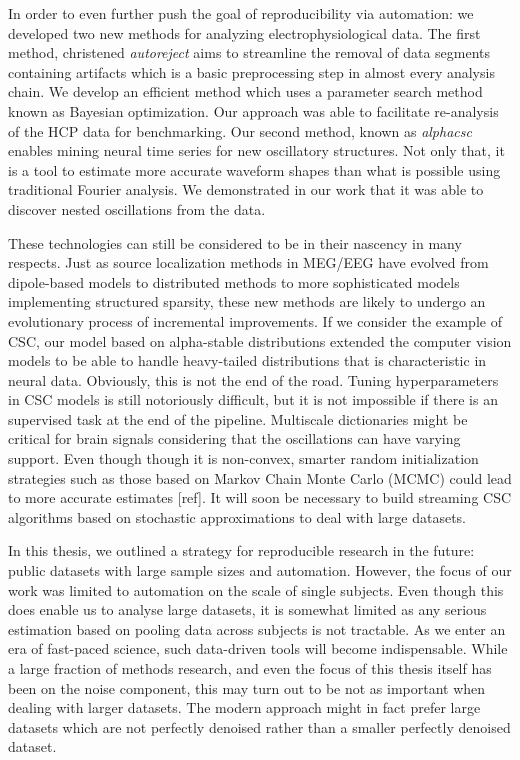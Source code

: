 In order to even further push the goal of reproducibility via automation: we developed two new methods for analyzing electrophysiological data. The first method, christened \emph{autoreject} aims to streamline the removal of data segments containing artifacts which is a basic preprocessing step in almost every analysis chain. We develop an efficient method which uses a parameter search method known as Bayesian optimization. Our approach was able to facilitate re-analysis of the \ac{HCP} data for benchmarking. Our second method, known as \emph{alphacsc} enables mining neural time series for new oscillatory structures. Not only that, it is a tool to estimate more accurate waveform shapes than what is possible using traditional Fourier analysis. We demonstrated in our work that it was able to discover nested oscillations from the data.

These technologies can still be considered to be in their nascency in many respects. Just as source localization methods in \ac{MEG}/\ac{EEG} have evolved from dipole-based models to distributed methods to more sophisticated models implementing structured sparsity, these new methods are likely to undergo an evolutionary process of incremental improvements. If we consider the example of \ac{CSC}, our model based on alpha-stable distributions extended the computer vision models to be able to handle heavy-tailed distributions that is characteristic in neural data. Obviously, this is not the end of the road. Tuning hyperparameters in \ac{CSC} models is still notoriously difficult, but it is not impossible if there is an supervised task at the end of the pipeline. Multiscale dictionaries might be critical for brain signals considering that the oscillations can have varying support. Even though though it is non-convex, smarter random initialization strategies such as those based on Markov Chain Monte Carlo (MCMC) could lead to more accurate estimates [ref]. It will soon be necessary to build streaming \ac{CSC} algorithms based on stochastic approximations to deal with large datasets.

In this thesis, we outlined a strategy for reproducible research in the future: public datasets with large sample sizes and automation. However, the focus of our work was limited to automation on the scale of single subjects. Even though this does enable us to analyse large datasets, it is somewhat limited as any serious estimation based on pooling data across subjects is not tractable. As we enter an era of fast-paced science, such data-driven tools will become indispensable. While a large fraction of methods research, and even the focus of this thesis itself has been on the noise component, this may turn out to be not as important when dealing with larger datasets. The modern approach might in fact prefer large datasets which are not perfectly denoised rather than a smaller perfectly denoised dataset. 

